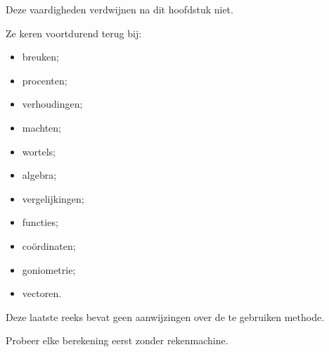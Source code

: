 \documentclass{ximera}
\begin{document}
\begin{opmerking}
\begin{itemize}
\end{itemize}

Deze vaardigheden verdwijnen na dit hoofdstuk niet.

Ze keren voortdurend terug bij:

\begin{itemize}
    \item breuken;
    \item procenten;
    \item verhoudingen;
    \item machten;
    \item wortels;
    \item algebra;
    \item vergelijkingen;
    \item functies;
    \item coördinaten;
    \item goniometrie;
    \item vectoren.
\end{itemize}

\end{opmerking}




Deze laatste reeks bevat geen aanwijzingen over de te gebruiken methode.

Probeer elke berekening eerst zonder rekenmachine.
\end{document}
